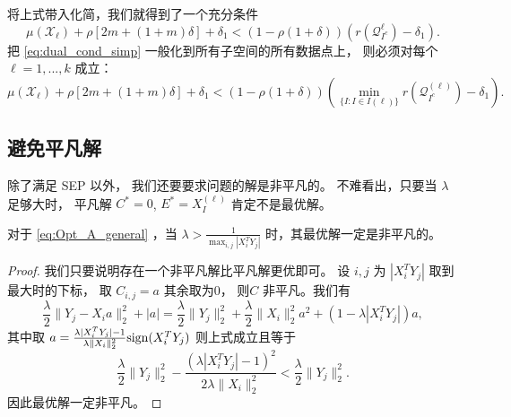 \documentclass[main.tex]{subfiles}
\begin{document}
将上式带入化简，我们就得到了一个充分条件
\begin{equation}\label{eq:dual_cond_simp}
  \mu(\mathcal{X}_{\ell}) +\rho [2m+(1+m)\delta] +\delta_1
  < \left(1-\rho(1+\delta)\right)(r(\mathcal{Q}_{I^c}^{\ell})-\delta_1).
\end{equation}
把 \eqref{eq:dual_cond_simp} 一般化到所有子空间的所有数据点上，
则必须对每个$\ell = 1,...,k$ 成立：
\begin{equation}\label{eq:Thm1_all}
  \mu(\mathcal{X}_{\ell}) +\rho [2m+(1+m)\delta] +\delta_1
  < \left(1-\rho(1+\delta)\right)\left(\min_{\{I: I\in I(\ell)\}}r(\mathcal{Q}^{(\ell)}_{I^c})-\delta_1\right).
\end{equation}

\subsection{避免平凡解}\label{sec:avoid_trivial}
除了满足 SEP 以外， 我们还要要求问题的解是非平凡的。 不难看出，只要当 $\lambda$
足够大时， 平凡解 $C^* = 0$, $E^*=X_I^{(\ell)}$ 肯定不是最优解。

\begin{lemma}\label{lemma:avoid_trivial}
  对于 \eqref{eq:Opt_A_general} ，当 $\lambda > \frac{1}{\max_{i,j} |X_i^T
Y_j|}$ 时，其最优解一定是非平凡的。
\end{lemma}

\begin{proof}
  我们只要说明存在一个非平凡解比平凡解更优即可。 设 $i, j$ 为 $|X_i^T
  Y_j|$ 取到最大时的下标， 取 $C_{i,j} = a$ 其余取为$0$， 则$C$
  非平凡。我们有
  $$ \frac{\lambda}{2} \|Y_j - X_i a \|_2^2 + |a| = \frac{\lambda}{2}
  \|Y_j\|_2^2 + \frac{\lambda}{2} \|X_i\|_2^2 a^2 +\left( 1-\lambda |X_i^T Y_j|
  \right)a, $$
  其中取 $a = \frac{\lambda |X_i^T Y_j|-1}{\lambda \|X_i\|_2^2} \mathrm{sign}(X_i^T Y_j)$
  则上式成立且等于
  $$ \frac{\lambda}{2} \|Y_j\|_2^2 - \frac{(\lambda|X_i^T Y_j| -1)^2}
  {2 \lambda \|X_i\|_2^2 } < \frac{\lambda}{2} \|Y_j\|_2^2. $$
  因此最优解一定非平凡。
\end{proof}
\end{document}
